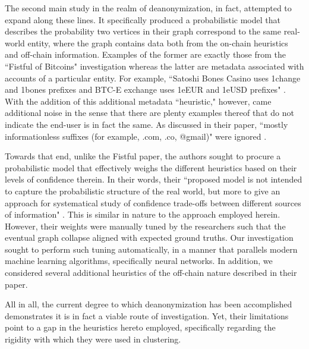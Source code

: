 \documentclass{article}
\begin{document}
The second main study in the realm of deanonymization, in fact, attempted to expand along these lines. It specifically produced a probabilistic model that describes the probability two vertices in their graph correspond to the same real-world entity, where the graph contains data both from the on-chain heuristics and off-chain information. Examples of the former are exactly those from the ``Fistful of Bitcoins" investigation whereas the latter are metadata associated with accounts of a particular entity. For example, ``Satoshi Bones Casino uses 1change and 1bones prefixes and BTC-E exchange uses 1eEUR and 1eUSD prefixes" \cite{automatic}. With the addition of this additional metadata ``heuristic," however, came additional noise in the sense that there are plenty examples thereof that do not indicate the end-user is in fact the same. As discussed in their paper, ``mostly informationless suffixes  (for example, .com, .co, @gmail)" were ignored \cite{automatic}. 

Towards that end, unlike the Fistful paper, the authors sought to procure a probabilistic model that effectively weighs the different heuristics based on their levels of confidence therein. In their words, their ``proposed  model  is  not  intended  to  capture the probabilistic structure of the real world, but more to give an  approach  for  systematical  study  of  confidence  trade-offs between different sources of information" \cite{automatic}. This is similar in nature to the approach employed herein. However, their weights were manually tuned by the researchers such that the eventual graph collapse aligned with expected ground truths. Our investigation sought to perform such tuning automatically, in a manner that parallels modern machine learning algorithms, specifically neural networks. In addition, we considered several additional heuristics of the off-chain nature described in their paper.

All in all, the current degree to which deanonymization has been accomplished demonstrates it is in fact a viable route of investigation. Yet, their limitations point to a gap in the heuristics hereto employed, specifically regarding the rigidity with which they were used in clustering.
\end{document}
